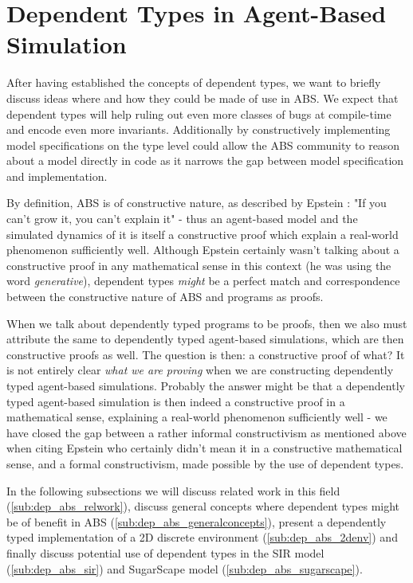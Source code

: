 \section{Dependent Types in Agent-Based Simulation}
\label{sec:dep_absconcepts}

After having established the concepts of dependent types, we want to briefly discuss ideas where and how they could be made of use in ABS. We expect that dependent types will help ruling out even more classes of bugs at compile-time and encode even more invariants. Additionally by constructively implementing model specifications on the type level could allow the ABS community to reason about a model directly in code as it narrows the gap between model specification and implementation.

By definition, ABS is of constructive nature, as described by Epstein \cite{epstein_chapter_2006}: "If you can't grow it, you can't explain it" - thus an agent-based model and the simulated dynamics of it is itself a constructive proof which explain a real-world phenomenon sufficiently well. Although Epstein certainly wasn't talking about a constructive proof in any mathematical sense in this context (he was using the word \textit{generative}), dependent types \textit{might} be a perfect match and correspondence between the constructive nature of ABS and programs as proofs.

When we talk about dependently typed programs to be proofs, then we also must attribute the same to dependently typed agent-based simulations, which are then constructive proofs as well. The question is then: a constructive proof of what? It is not entirely clear \textit{what we are proving} when we are constructing dependently typed agent-based simulations. Probably the answer might be that a dependently typed agent-based simulation is then indeed a constructive proof in a mathematical sense, explaining a real-world phenomenon sufficiently well - we have closed the gap between a rather informal constructivism as mentioned above when citing Epstein who certainly didn't mean it in a constructive mathematical sense, and a formal constructivism, made possible by the use of dependent types.

In the following subsections we will discuss related work in this field (\ref{sub:dep_abs_relwork}), discuss general concepts where dependent types might be of benefit in ABS (\ref{sub:dep_abs_generalconcepts}), present a dependently typed implementation of a 2D discrete environment (\ref{sub:dep_abs_2denv}) and finally discuss potential use of dependent types in the SIR model (\ref{sub:dep_abs_sir}) and SugarScape model (\ref{sub:dep_abs_sugarscape}).

